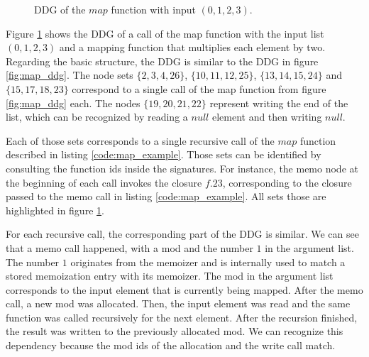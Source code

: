\begin{figure}
\caption{DDG of the $map$ function with input $(0, 1, 2, 3)$.}
\label{fig:map_tbd_ddg}
\end{figure}


Figure \ref{fig:map_tbd_ddg} shows the DDG of a call of the map function with the input list $(0, 1, 2, 3)$ and a mapping function that multiplies each element by two. Regarding the basic structure, the DDG is similar to the DDG in figure \ref{fig:map_ddg}. The node sets $\{2, 3, 4, 26\}$, $\{10, 11, 12, 25\}$, $\{13, 14, 15, 24\}$ and $\{15, 17, 18, 23\}$ correspond to a single call of the map function from figure \ref{fig:map_ddg} each. The nodes $\{19, 20, 21, 22\}$ represent writing the end of the list, which can be recognized by reading a $null$ element and then writing $null$. 

Each of those sets corresponds to a single recursive call of the $map$ function described in listing \ref{code:map_example}. Those sets can be identified by consulting the function ids inside the signatures. For instance, the memo node at the beginning of each call invokes the closure $f.23$, corresponding to the closure passed to the memo call in listing \ref{code:map_example}. All sets those are highlighted in figure \ref{fig:map_tbd_ddg}.

For each recursive call, the corresponding part of the DDG is similar. We can see that a memo call happened, with a mod and the number $1$ in the argument list. The number $1$ originates from the memoizer and is internally used to match a stored memoization entry with its memoizer. The mod in the argument list corresponds to the input element that is currently being mapped. After the memo call, a new mod was allocated. Then, the input element was read and the same function was called recursively for the next element. After the recursion finished, the result was written to the previously allocated mod. We can recognize this dependency because the mod ids of the allocation and the write call match. 

